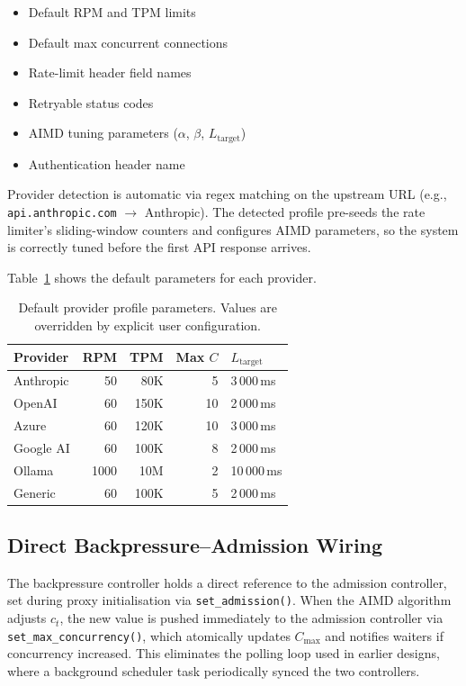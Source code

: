 \documentclass[11pt,twocolumn]{article}
\begin{document}
\begin{itemize}[nosep]
  \item Default RPM and TPM limits
  \item Default max concurrent connections
  \item Rate-limit header field names
  \item Retryable status codes
  \item AIMD tuning parameters ($\alpha$, $\beta$, $L_{\text{target}}$)
  \item Authentication header name
\end{itemize}

Provider detection is automatic via regex matching on the
upstream URL (e.g., \texttt{api.anthropic.com} $\to$ Anthropic).
The detected profile pre-seeds the rate limiter's sliding-window
counters and configures AIMD parameters, so the system is
correctly tuned before the first API response arrives.

Table~\ref{tab:providers} shows the default parameters for each
provider.

\begin{table}[t]
\centering
\caption{Default provider profile parameters.  Values are
overridden by explicit user configuration.}
\label{tab:providers}
\begin{tabular}{@{}lrrrl@{}}
\toprule
Provider & RPM & TPM & Max $C$ & $L_{\text{target}}$ \\
\midrule
Anthropic   & 50    & 80K   & 5  & 3\,000\,ms \\
OpenAI      & 60    & 150K  & 10 & 2\,000\,ms \\
Azure       & 60    & 120K  & 10 & 3\,000\,ms \\
Google AI   & 60    & 100K  & 8  & 2\,000\,ms \\
Ollama      & 1000  & 10M   & 2  & 10\,000\,ms \\
Generic     & 60    & 100K  & 5  & 2\,000\,ms \\
\bottomrule
\end{tabular}
\end{table}

\subsection{Direct Backpressure--Admission Wiring}

The backpressure controller holds a direct reference to the
admission controller, set during proxy initialisation via
\texttt{set\_admission()}.  When the AIMD algorithm adjusts
$c_t$, the new value is pushed immediately to the admission
controller via \texttt{set\_max\_concurrency()}, which
atomically updates $C_{\max}$ and notifies waiters if
concurrency increased.  This eliminates the polling loop used
in earlier designs, where a background scheduler task
periodically synced the two controllers.
\end{document}
